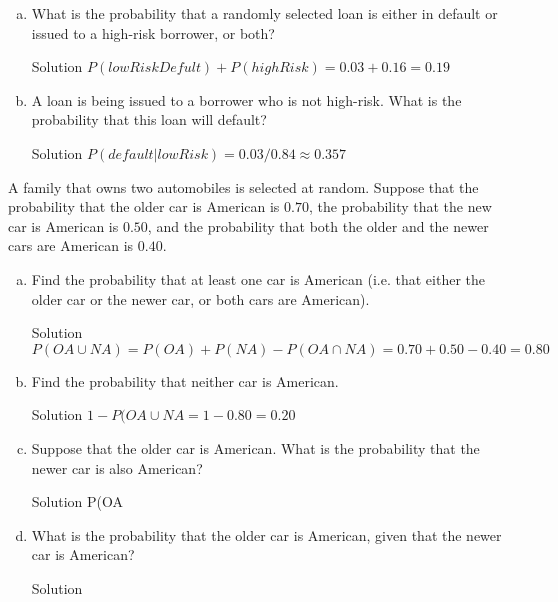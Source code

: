 \documentclass{article}
\begin{document}
\begin{spacing}{1.1}
\begin{homeworkProblem}
\begin{enumerate}[(a)]
\begin{homeworkSection}{Solution}
			\end{homeworkSection}	
		\item What is the probability that a randomly selected loan is either in default or issued to a high-risk borrower, or both? 
			\begin{homeworkSection}{Solution}
				$P(lowRiskDefult)+P(highRisk) = 0.03 + 0.16 = 0.19$
			\end{homeworkSection}	
		\item A loan is being issued to a borrower who is not high-risk.  What is the probability that this loan will default? 
			\begin{homeworkSection}{Solution}
				$P(default | lowRisk) = 0.03/0.84 \approx 0.357$
			\end{homeworkSection}				
	\end{enumerate}			
\end{homeworkProblem}
\begin{homeworkProblem}
A family that owns two automobiles is selected at random.  Suppose that the probability that the older car is American is $0.70$, the probability that the new car is American is $0.50$, and the probability that both the older and the newer cars are American is $0.40$.  
	\begin{enumerate}[(a)]
		\item Find the probability that at least one car is American (i.e. that either the older car or the newer car, or both cars are American).  
			\begin{homeworkSection}{Solution}
				$P(OA \cup NA) = P(OA) + P(NA) - P( OA \cap NA) = 0.70 + 0.50 - 0.40 = 0.80$
			\end{homeworkSection}	
		\item Find the probability that neither car is American.  
			\begin{homeworkSection}{Solution}
				$1 - P(OA \cup NA = 1 - 0.80 = 0.20 $
			\end{homeworkSection}	
		\item Suppose that the older car is American.  What is the probability that the newer car is also American?
			\begin{homeworkSection}{Solution}
				P(OA 
			\end{homeworkSection}	
		\item What is the probability that the older car is American, given that the newer car is American? 
			\begin{homeworkSection}{Solution}


\end{homeworkSection}
\end{enumerate}
\end{homeworkProblem}
\end{spacing}
\end{document}
